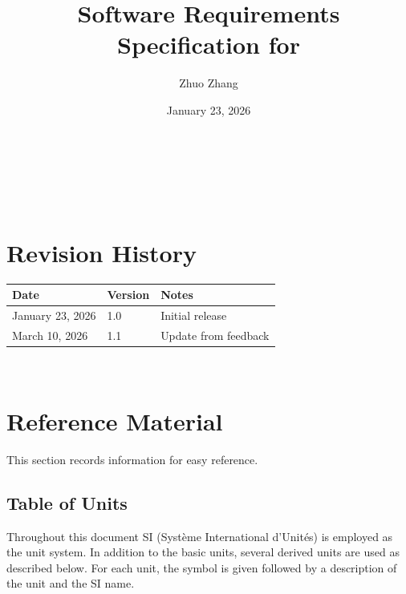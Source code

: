 \documentclass[12pt]{article}
\begin{document}
\title{Software Requirements Specification for \progname{}}
\author{Zhuo Zhang}
\date{January 23, 2026}

\maketitle

~\newpage


\tableofcontents

~\newpage

\section*{Revision History}

\begin{tabularx}{\textwidth}{p{3cm}p{2cm}X}
\toprule {\bf Date} & {\bf Version} & {\bf Notes}\\
\midrule
January 23, 2026 & 1.0 & Initial release\\
March 10, 2026 & 1.1 & Update from feedback\\
\bottomrule
\end{tabularx}



~\newpage

\section{Reference Material}

This section records information for easy reference.

\subsection{Table of Units}

Throughout this document SI (Syst\`{e}me International d'Unit\'{e}s) is employed
as the unit system. In addition to the basic units, several derived units are
used as described below. For each unit, the symbol is given followed by a
description of the unit and the SI name.
~\newline
\end{document}
